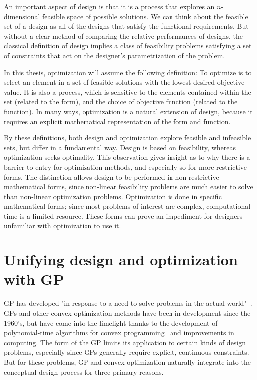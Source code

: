 An important aspect of design is that it is a process that explores an
$n$-dimensional feasible space of possible solutions.
We can think about the feasible set of a design as all of the designs
that satisfy the functional requirements. But without a clear method of comparing
the relative performances of designs, the classical
definition of design implies a class of feasibility problems satisfying a set of
constraints that act on the designer's parametrization of the problem.

In this thesis, optimization will assume the following definition: To optimize is to select an
element in a set of feasible solutions with the lowest desired objective
value. It is also a process, which is sensitive to the elements contained within the set
(related to the form), and the choice of objective function (related to the
function).
In many ways, optimization is a natural extension of design, because it requires
an explicit mathematical representation of the form and function.

By these definitions, both design and
optimization explore feasible and infeasible sets, but differ in a fundamental way.
Design is based on feasibility, whereas optimization seeks optimality.
This observation gives insight as to why there is a barrier
to entry for optimization methods, and especially so for more restrictive forms.
The distinction allows design to be performed
in non-restrictive mathematical forms, since non-linear feasibility problems are
much easier to solve than non-linear optimization problems. Optimization is
done in specific mathematical forms; since most problems of interest are complex,
computational time is a limited resource. These forms can prove
an impediment for designers unfamiliar with optimization to use it.

\section{Unifying design and optimization with GP}

\gls{GP} has developed "in response to a need to solve problems in the actual
world"~\cite{duffingp}. \gls{GP}s and other convex optimization methods have been
in development since the 1960's, but have come into the limelight thanks to the development of
polynomial-time algorithms for convex programming~\cite{interior_point} and
improvements in computing. The form of the \gls{GP} limits its application
to certain kinds of design
problems, especially since \gls{GP}s generally require explicit, continuous constraints.
But for these problems, \gls{GP} and convex
optimization naturally integrate into the conceptual design process
for three primary reasons.


